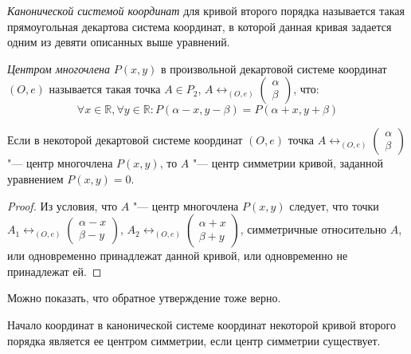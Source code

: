\begin{definition}
	\textit{Канонической системой координат} для кривой второго порядка называется такая прямоугольная декартова система координат, в которой данная кривая задается одним из девяти описанных выше уравнений.
\end{definition}

\begin{definition}
	\textit{Центром многочлена} $P(x, y)$ в произвольной декартовой системе координат $(O, e)$ называется такая точка $A \in P_2$, $A \leftrightarrow_{(O, e)} \begin{pmatrix}\alpha\\\beta\end{pmatrix}$, что:
	\[\forall x \in \mathbb{R}, \forall y \in \mathbb{R} : P(\alpha - x, y -\beta) = P(\alpha + x, y + \beta)\]
\end{definition}

\begin{proposition}
	Если в некоторой декартовой системе координат $(O, e)$ точка $A \leftrightarrow_{(O, e)} \begin{pmatrix}\alpha\\\beta\end{pmatrix}$ "--- центр многочлена $P(x, y)$, то $A$ "--- центр симметрии кривой, заданной уравнением $P(x, y) = 0$.
\end{proposition}

\begin{proof}
	Из условия, что $A$ "--- центр многочлена $P(x, y)$ следует, что точки $A_1 \leftrightarrow_{(O, e)} \begin{pmatrix}\alpha - x\\\beta - y\end{pmatrix}$, $A_2 \leftrightarrow_{(O, e)} \begin{pmatrix}\alpha + x\\\beta + y\end{pmatrix}$, симметричные относительно $A$, или одновременно принадлежат данной кривой, или одновременно не принадлежат ей.
\end{proof}

\begin{note}
	Можно показать, что обратное утверждение тоже верно.
\end{note}

\begin{note}
	Начало координат в канонической системе координат некоторой кривой второго порядка является ее центром симметрии, если центр симметрии существует.
\end{note}

